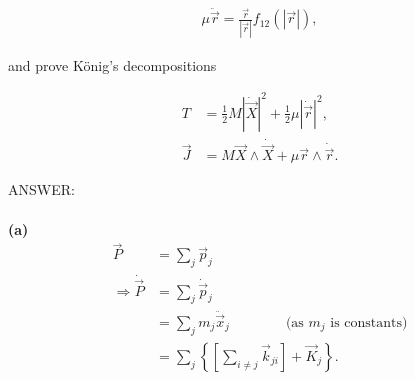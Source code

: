 \documentclass[12pt]{article}
\begin{document}
\begin{align*}
\mu\ddot{\vec{r}}
=
\frac{\vec{r}}{|\vec{r}|}f_{12}(|\vec{r}|),
\end{align*}

\hspace*{1cm}and prove K\"onig's decompositions

\begin{align*}
T
&=
\frac{1}{2}M|\dot{\vec{X}}|^2
+
\frac{1}{2}\mu|\dot{\vec{r}}|^2,
\\
\vec{J}
&=
M\vec{X}\wedge\dot{\vec{X}}
+
\mu\vec{r}\wedge\dot{\vec{r}}.
\end{align*}

\newpage
\noindent
ANSWER:\\
\\
\textbf{(a)}
\begin{align*}
\vec{P} &= \sum_j \vec{p}_j \\
\Rightarrow \dot{\vec{P}}
&= \sum_j \dot{\vec{p}}_j \\
&= \sum_j m_j \ddot{\vec{x}}_j
\qquad \qquad \text{(as $m_j$ is constants)} \\
&= \sum_j \left\{
\left[\sum_{i\neq j}\vec{k}_{ji}\right]+\vec{K}_j
\right\}. \tag{4.1}
\end{align*}
\end{document}

